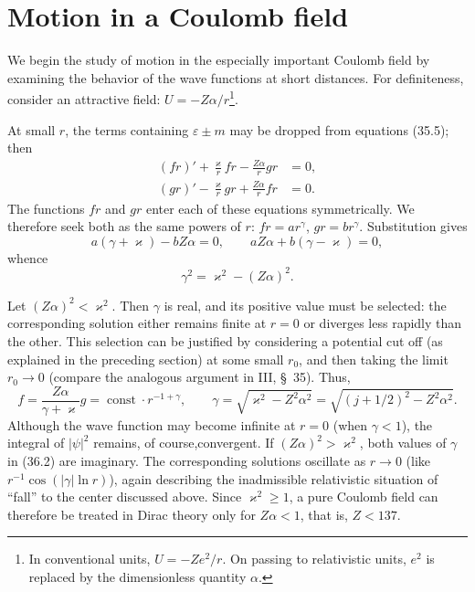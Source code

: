 
\section{Motion in a Coulomb field}

We begin the study of motion in the especially important Coulomb field by examining the behavior of the wave functions at short distances. For definiteness, consider an attractive field: $U=-Z\alpha/r$\footnote{In conventional units, $U=-Ze^2/r$. On passing to relativistic units, $e^2$ is replaced by the dimensionless quantity $\alpha$.}.

At small $r$, the terms containing $\varepsilon\pm m$ may be dropped from equations (35.5); then
\[
\begin{aligned}
(fr)'+\frac\varkappa rfr-\frac{Z\alpha}{r}gr&=0,\\
(gr)'-\frac\varkappa rgr+\frac{Z\alpha}{r}fr&=0.
\end{aligned}
\]
The functions $fr$ and $gr$ enter each of these equations symmetrically. We therefore seek both as the same powers of $r$: $fr=ar^\gamma$, $gr=br^\gamma$. Substitution gives
\[
a(\gamma+\varkappa)-bZ\alpha=0,
\qquad
aZ\alpha+b(\gamma-\varkappa)=0,
\]
whence
\begin{equation}
\gamma^2=\varkappa^2-(Z\alpha)^2.
\tag{36.1}
\end{equation}

Let $(Z\alpha)^2<\varkappa^2$. Then $\gamma$ is real, and its positive value must be selected: the corresponding solution either remains finite at $r=0$ or diverges less rapidly than the other. This selection can be justified by considering a potential cut off (as explained in the preceding section) at some small $r_0$, and then taking the limit $r_0\to0$ (compare the analogous argument in III, \S~35). Thus,
\begin{equation}
f=\frac{Z\alpha}{\gamma+\varkappa}g
=\operatorname{const}\cdot r^{-1+\gamma},
\qquad
\gamma=\sqrt{\varkappa^2-Z^2\alpha^2}
=\sqrt{(j+1/2)^2-Z^2\alpha^2}.
\tag{36.2}
\end{equation}
Although the wave function may become infinite at $r=0$ (when $\gamma<1$), the integral of $|\psi|^2$ remains, of course,convergent. If $(Z\alpha)^2>\varkappa^2$, both values of $\gamma$ in (36.2) are imaginary. The corresponding solutions oscillate as $r\to0$ (like $r^{-1}\cos(|\gamma|\ln r)$), again describing the inadmissible relativistic situation of ``fall'' to the center discussed above. Since $\varkappa^2\geqslant1$, a pure Coulomb field can therefore be treated in Dirac theory only for $Z\alpha<1$, that is, $Z<137$.

